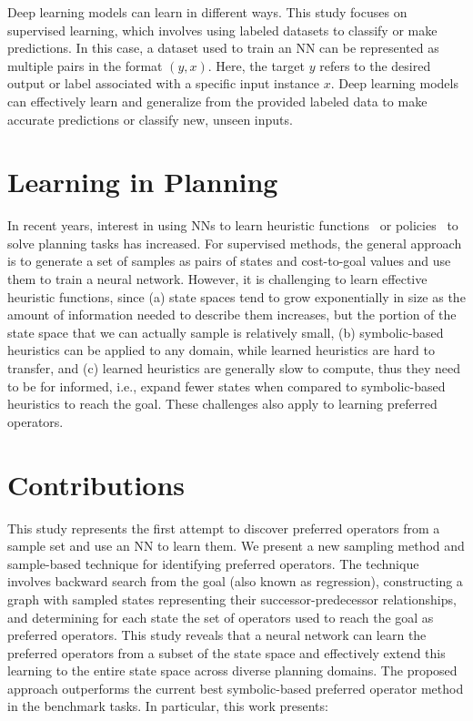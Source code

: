 \documentclass[ppgc,diss,english]{iiufrgs}
\begin{document}
Deep learning models can learn in different ways. This study focuses on supervised learning, which involves using labeled datasets to classify or make predictions. In this case, a dataset used to train an NN can be represented as multiple pairs in the format $(y, x)$. Here, the target $y$ refers to the desired output or label associated with a specific input instance $x$. Deep learning models can effectively learn and generalize from the provided labeled data to make accurate predictions or classify new, unseen inputs.

\section{Learning in Planning}
In recent years, interest in using NNs to learn heuristic functions~\cite{Ferber.etal/2020a,Yu.etal/2020,Shen.etal/2020,Ferber.etal/2022,OToole/2022} or policies~\cite{Toyer.etal/2018,Toyer.etal/2020,Stahlberg.etal/2022} to solve planning tasks has increased. For supervised methods, the general approach is to generate a set of samples as pairs of states and cost-to-goal values and use them to train a neural network. However, it is challenging to learn effective heuristic functions, since (a) state spaces tend to grow exponentially in size as the amount of information needed to describe them increases, but the portion of the state space that we can actually sample is relatively small, (b) symbolic-based heuristics can be applied to any domain, while learned heuristics are hard to transfer, and (c) learned heuristics are generally slow to compute, thus they need to be for informed, i.e., expand fewer states when compared to symbolic-based heuristics to reach the goal. These challenges also apply to learning preferred operators.

\section{Contributions}
This study represents the first attempt to discover preferred operators from a sample set and use an NN to learn them. We present a new sampling method and sample-based technique for identifying preferred operators. The technique involves backward search from the goal (also known as regression), constructing a graph with sampled states representing their successor-predecessor relationships, and determining for each state the set of operators used to reach the goal as preferred operators. This study reveals that a neural network can learn the preferred operators from a subset of the state space and effectively extend this learning to the entire state space across diverse planning domains. The proposed approach outperforms the current best symbolic-based preferred operator method in the benchmark tasks. In particular, this work presents:
\end{document}
